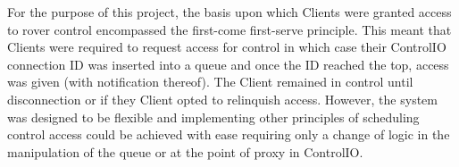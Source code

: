           For the purpose of this project, the basis upon which Clients were granted access to rover control encompassed the first-come first-serve principle. This meant that Clients were required to request access for control in which case their ControlIO connection ID was inserted into a queue and once the ID reached the top, access was given (with notification thereof). The Client remained in control until disconnection or if they Client opted to relinquish access. However, the system was designed to be flexible and implementing other principles of scheduling control access could be achieved with ease requiring only a change of logic in the manipulation of the queue or at the point of proxy in ControlIO.
          
        \\\\
